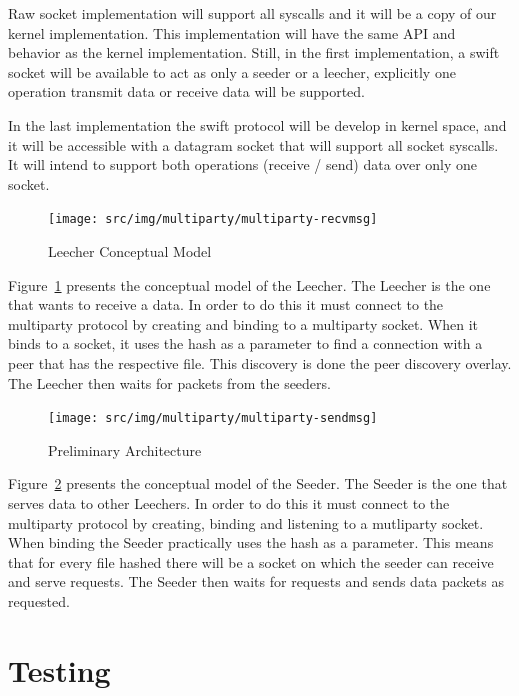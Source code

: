 Raw socket implementation will support all syscalls and it will be a copy of
our kernel implementation.  This implementation will have the same API and
behavior as the kernel implementation. Still, in the first implementation, a
swift socket will be available to act as only a seeder or a leecher,
explicitly one operation transmit data or receive data will be supported.

In the last implementation the swift protocol will be develop in kernel space,
and it will be accessible with a datagram socket that will support all socket
syscalls. It will intend to support both operations (receive / send) data over
only one socket.

\begin{figure}
  \centering
  \texttt{[image: src/img/multiparty/multiparty-recvmsg]}
  \caption{Leecher Conceptual Model}
  \label{fig:multiparty:multiparty-recvmsg}
\end{figure}

Figure~\ref{fig:multiparty:multiparty-recvmsg} presents the conceptual model
of the Leecher. The Leecher is the one that wants to receive a data. In order
to do this it must connect to the multiparty protocol by creating and binding
to a multiparty socket. When it binds to a socket, it uses the hash as a
parameter to find a connection with a peer that has the respective file. This
discovery is done the peer discovery overlay. The Leecher then waits for
packets from the seeders.

\begin{figure}
  \centering
  \texttt{[image: src/img/multiparty/multiparty-sendmsg]}
  \caption{Preliminary Architecture}
  \label{fig:multiparty:multiparty-sendmsg}
\end{figure}

Figure~\ref{fig:multiparty:multiparty-sendmsg} presents the conceptual model
of the Seeder. The Seeder is the one that serves data to other Leechers. In
order to do this it must connect to the multiparty protocol by creating,
binding and listening to a mutliparty socket. When binding the Seeder
practically uses the hash as a parameter. This means that for every file
hashed there will be a socket on which the seeder can receive and serve
requests. The Seeder then waits for requests and sends data packets as
requested.

\section{Testing}
\label{sec:multiparty:testing}

